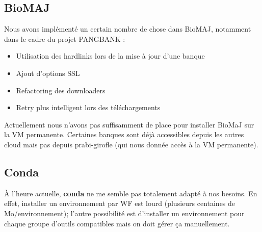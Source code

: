 \subsection{BioMAJ}

Nous avons implémenté un certain nombre de chose dans BioMAJ, notamment dans le cadre du projet PANGBANK :
\begin{itemize}
    \item Utilisation des hardlinks lors de la mise à jour d'une banque
    \item Ajout d'options SSL
    \item Refactoring des downloaders
    \item Retry plus intelligent lors des téléchargements
\end{itemize}
Actuellement nous n'avons pas suffisamment de place pour installer BioMaJ sur la VM permanente.
Certaines banques sont déjà accessibles depuis les autres cloud mais pas depuis prabi-girofle (qui nous donnée accès à la VM permanente).

\subsection{Conda}
À l'heure actuelle, \textbf{conda} ne me semble pas totalement adapté à nos besoins.
En effet, installer un environnement par WF est lourd (plusieurs centaines de Mo/environnement); l'autre possibilité est d'installer un environnement pour chaque groupe d'outils compatibles mais on doit gérer ça manuellement.
